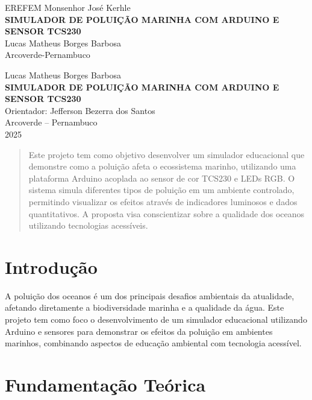 \documentclass[12pt]{article}
\begin{document}
\begin{titlepage}
    \centering
    {\large EREFEM Monsenhor José Kerhle }\\[2cm]
    {\Large\bfseries SIMULADOR DE POLUIÇÃO MARINHA COM ARDUINO E SENSOR TCS230}\\[2cm]
    {\large Lucas Matheus Borges Barbosa }\\[4cm]
    {\large Arcoverde-Pernambuco}
\end{titlepage}

\begin{titlepage}
    \centering
    {\large Lucas Matheus Borges Barbosa}\\[2cm]
    {\Large\bfseries SIMULADOR DE POLUIÇÃO MARINHA COM ARDUINO E SENSOR TCS230}\\[1.5cm]
    Orientador: Jefferson Bezerra dos Santos \\[3cm]
    {\large Arcoverde -- Pernambuco}\\
    {\large 2025}
\end{titlepage}

\begin{abstract}
    Este projeto tem como objetivo desenvolver um simulador educacional que demonstre como a poluição afeta o ecossistema marinho, utilizando uma plataforma Arduino acoplada ao sensor de cor TCS230 e LEDs RGB. O sistema simula diferentes tipos de poluição em um ambiente controlado, permitindo visualizar os efeitos através de indicadores luminosos e dados quantitativos. A proposta visa conscientizar sobre a qualidade dos oceanos utilizando tecnologias acessíveis.
\end{abstract}

\tableofcontents
\newpage

\section{Introdução}
A poluição dos oceanos é um dos principais desafios ambientais da atualidade, afetando diretamente a biodiversidade marinha e a qualidade da água. Este projeto tem como foco o desenvolvimento de um simulador educacional utilizando Arduino e sensores para demonstrar os efeitos da poluição em ambientes marinhos, combinando aspectos de educação ambiental com tecnologia acessível.

\section{Fundamentação Teórica}
\end{document}
